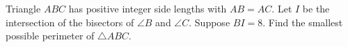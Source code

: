 Triangle $ABC$ has positive integer side lengths with $AB=AC$. Let $I$ be the intersection of the bisectors of $\angle B$ and $\angle C$. Suppose $BI=8$. Find the smallest possible perimeter of $\triangle ABC$.